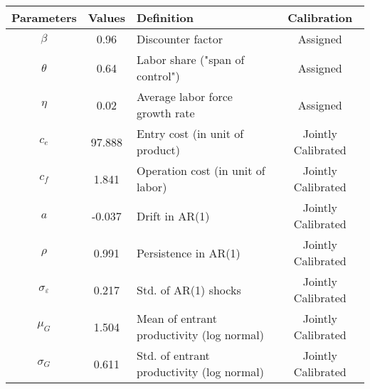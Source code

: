 \begin{tabular}{cclc}
\toprule
Parameters & Values & Definition & Calibration \\
\midrule
$\beta$ & 0.96 & Discounter factor & Assigned \\
$\theta$ & 0.64 & Labor share ("span of control") & Assigned \\
$\eta$ & 0.02 & Average labor force growth rate & Assigned \\
$c_e$ & 97.888 & Entry cost (in unit of product) & Jointly Calibrated \\
$c_f$ & 1.841 & Operation cost (in unit of labor) & Jointly Calibrated \\
$a$ & -0.037 & Drift in AR(1) & Jointly Calibrated \\
$\rho$ & 0.991 & Persistence in AR(1) & Jointly Calibrated \\
$\sigma_{\varepsilon}$ & 0.217 & Std. of AR(1) shocks & Jointly Calibrated \\
$\mu_{G}$ & 1.504 & Mean of entrant productivity (log normal) & Jointly Calibrated \\
$\sigma_{G}$ & 0.611 & Std. of entrant productivity (log normal) & Jointly Calibrated \\
\bottomrule
\end{tabular}
